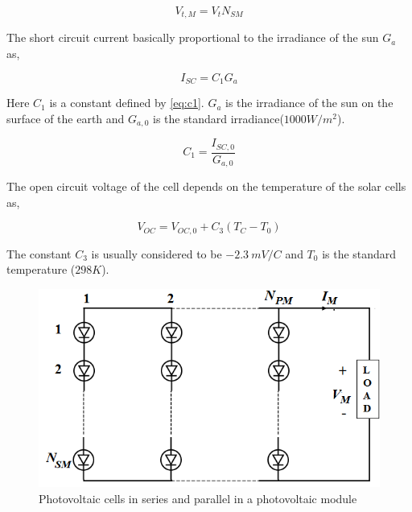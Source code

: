 \documentclass[journal]{IEEEtran/IEEEtran}
\begin{document}
	\begin{equation}
	\label{eq:vtm}
	V_{t,M} = V_tN_{SM}
	\end{equation}
	
	The short circuit current basically proportional to the irradiance of the sun $G_a$ as,
	
	\begin{equation}
	\label{eq:isc}
	I_{SC} = C_1G_a 
	\end{equation}
	
	Here $C_1$ is a constant defined by \eqref{eq:c1}. $G_a$ is the irradiance of the sun on the surface of the earth and $G_{a,0}$ is the standard irradiance($1000 W/m^2$).
	
	\begin{equation}
	\label{eq:c1}
	C_1 = \frac{I_{SC,0}}{G_{a,0} }
	\end{equation}
	
	The open circuit voltage of the cell depends on the temperature of the solar cells as,
	
	\begin{equation}
	\label{eq:voc}
	V_{OC} = V_{OC,0} + C_3\left(T_C-T_0\right)
	\end{equation}
	
	The constant $C_3$ is usually considered to be $-2.3~mV/C$ \cite{pvmodel} and $T_0$ is the standard temperature ($298K$).
	
	
	\begin{figure}[!tb]
		\centering
		\includegraphics[width=\linewidth]{cell_array.png}
		\caption{Photovoltaic cells in series and parallel in a photovoltaic module}
		\label{fig:module}
	\end{figure}
	
	
\end{document}
